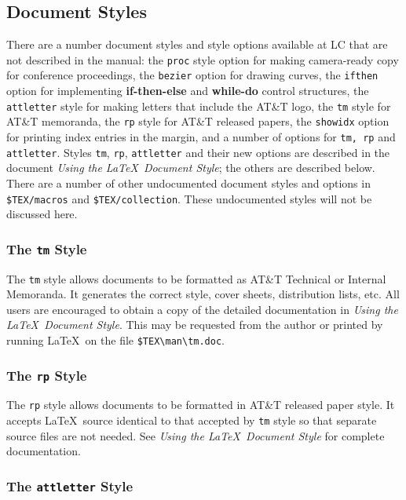 \subsection{Document Styles}


There are a number document styles and style options available at LC that
are not described in the manual: the \mbox{\tt proc} style option for
making camera-ready copy for conference proceedings, the {\tt bezier}
option for drawing curves, the {\tt ifthen} option for implementing
{\bf if-then-else} and {\bf while-do} control structures, the \mbox{\tt
attletter} style for making letters that include the AT\&T logo, the
{\tt tm} style for AT\&T memoranda, the {\tt rp} style for AT\&T released
papers, the {\tt showidx} option for 
printing index entries in the margin, and a number of
options for {\tt tm, rp} and {\tt attletter}.
Styles {\tt tm}, {\tt rp}, {\tt attletter} and their new options are
described in the document {\it Using the \LaTeX\ Document
Style};\cite{bib:tmdoc} the others are
described below.  There are a number of other undocumented document
styles and options in \verb|$TEX/macros| and \verb|$TEX/collection|.
These undocumented styles will not be discussed here.  

\subsubsection{The {\tt tm} Style}

The {\tt tm} style allows documents to be formatted as AT\&T Technical
or Internal Memoranda.  It generates the correct style, cover sheets,
distribution lists, etc.  All users are encouraged to obtain a copy of
the detailed documentation in {\it Using the \LaTeX\ Document
Style}.\cite{bib:tmdoc}  This may be requested from the author or
printed by running \LaTeX\ on the file \verb|$TEX\man\tm.doc|.

\subsubsection{The {\tt rp} Style}

The {\tt rp} style allows documents to be formatted in AT\&T released
paper style.  It accepts \LaTeX\ source identical to that accepted by
{\tt tm} style so that separate source files are not needed.  See {\it
Using the \LaTeX\ Document Style}\cite{bib:tmdoc} for complete
documentation.  

\subsubsection{The {\tt attletter} Style}

